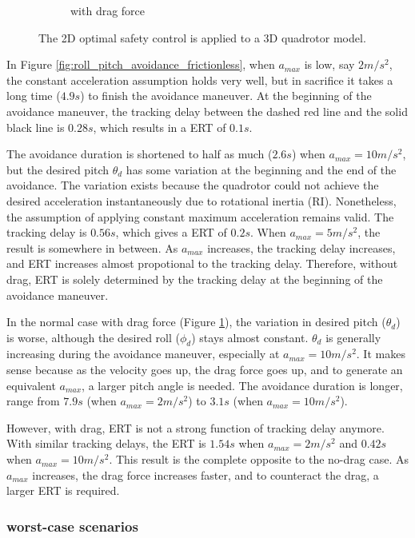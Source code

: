 \documentclass[journal,11pt,onecolumn,draftclsnofoot,]{IEEEtran}
\begin{document}
\begin{figure}
\begin{subfigure}{.47\columnwidth}
        \caption{with drag force}
        \label{fig:roll_pitch_avoidance_friction}
    \end{subfigure}
    \caption{The 
    2D optimal safety control is applied to a 3D quadrotor model.}
    \label{fig:roll_pitch_avoidance}
\end{figure}

In Figure \ref{fig:roll_pitch_avoidance_frictionless}, when $a_{max}$ is low, say $2m/s^2$, the constant acceleration assumption holds very well, but in sacrifice it takes a long time ($4.9 s$) to finish the avoidance maneuver. At the beginning of the avoidance maneuver, the tracking delay between the dashed red line and the solid black line is $0.28s$, which results in a ERT of $0.1s$.

The avoidance duration is shortened to half as much ($2.6 s$) when $a_{max}=10m/s^2$, but the desired pitch $\theta_d$ has some variation at the beginning and the end of the avoidance. The variation exists because the quadrotor could not achieve the desired acceleration instantaneously due to rotational inertia (RI). Nonetheless, the assumption of applying constant maximum acceleration remains valid. The tracking delay is $0.56s$, which gives a ERT of $0.2s$. When $a_{max}=5m/s^2$, the result is somewhere in between. As $a_{max}$ increases, the tracking delay increases, and ERT increases almost propotional to the tracking delay. Therefore, without drag, ERT is solely determined by the tracking delay at the beginning of the avoidance maneuver.

In the normal case with drag force (Figure \ref{fig:roll_pitch_avoidance_friction}), the variation in desired pitch ($\theta_d$) is worse, although the desired roll ($\phi_d$) stays almost constant. $\theta_d$ is generally increasing during the avoidance maneuver, especially at $a_{max}=10m/s^2$. It makes sense because as the velocity goes up, the drag force goes up, and to generate an equivalent $a_{max}$, a larger pitch angle is needed. The avoidance duration is longer, range from $7.9s$ (when $a_{max}=2m/s^2$) to $3.1s$ (when $a_{max}=10m/s^2$).

However, with drag, ERT is not a strong function of tracking delay anymore. With similar tracking delays, the ERT is $1.54s$ when $a_{max}=2m/s^2$ and $0.42s$ when $a_{max}=10m/s^2$. This result is the complete opposite to the no-drag case. As $a_{max}$ increases, the drag force increases faster, and to counteract the drag, a larger ERT is required.


\subsubsection{worst-case scenarios}
\end{document}
